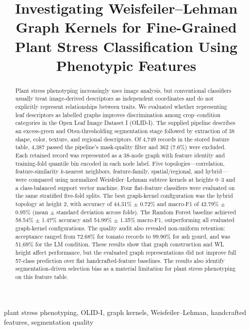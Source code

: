 \documentclass[conference]{IEEEtran}
\title{Investigating Weisfeiler–Lehman Graph Kernels for Fine-Grained Plant Stress Classification Using Phenotypic Features}
\begin{document}
\maketitle
\begin{abstract}
Plant stress phenotyping increasingly uses image analysis, but conventional classifiers usually treat image-derived descriptors as independent coordinates and do not explicitly represent relationships between traits. We evaluated whether representing leaf descriptors as labelled graphs improves discrimination among crop--condition categories in the Open Leaf Image Dataset I (OLID-I). The supplied pipeline describes an excess-green and Otsu-thresholding segmentation stage followed by extraction of 38 shape, color, texture, and regional descriptors. Of 4,749 records in the stored feature table, 4,387 passed the pipeline's mask-quality filter and 362 (7.6\%) were excluded. Each retained record was represented as a 38-node graph with feature identity and training-fold quantile bin encoded in each node label. Five topologies---correlation, feature-similarity $k$-nearest neighbors, feature-family, spatial/regional, and hybrid---were compared using normalized Weisfeiler--Lehman subtree kernels at heights 0--3 and a class-balanced support vector machine. Four flat-feature classifiers were evaluated on the same stratified five-fold splits. The best graph-kernel configuration was the hybrid topology at height 2, with accuracy of 44.31\% $\pm$ 0.72\% and macro-F1 of 42.79\% $\pm$ 0.95\% (mean $\pm$ standard deviation across folds). The Random Forest baseline achieved 58.54\% $\pm$ 1.47\% accuracy and 54.99\% $\pm$ 1.35\% macro-F1, outperforming all evaluated graph-kernel configurations. The quality audit also revealed non-uniform retention: acceptance ranged from 72.68\% for tomato records to 99.90\% for ash gourd, and was 51.69\% for the LM condition. These results show that graph construction and WL height affect performance, but the evaluated graph representations did not improve full 57-class prediction over flat handcrafted-feature baselines. The results also identify segmentation-driven selection bias as a material limitation for plant stress phenotyping on this feature table.
\end{abstract}

\begin{IEEEkeywords}
plant stress phenotyping, OLID-I, graph kernels, Weisfeiler--Lehman, handcrafted features, segmentation quality
\end{IEEEkeywords}
\end{document}
